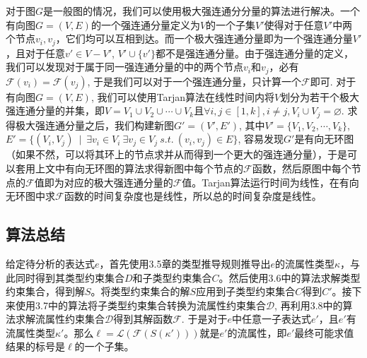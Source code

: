 \documentclass[12pt, titlepage]{article}
\let\emptyset\varnothing
\begin{document}
	对于图$G$是一般图的情况，我们可以使用极大强连通分分量的算法进行解决。一个有向图$G = (V, E)$的一个强连通分量定义为$V$的一个子集$V'$使得对于任意$V'$中两个节点$v_i, v_j$，它们均可以互相到达。而一个极大强连通分量即为一个强连通分量$V'$，且对于任意$v'\in V - V'$, $V'\cup\{v'\}$都不是强连通分量。由于强连通分量的定义，我们可以发现对于属于同一强连通分量的中的两个节点$v_i$和$v_j$，必有$\mathcal{F}(v_i) = \mathcal{F}(v_j)$, 于是我们可以对于一个强连通分量，只计算一个$\mathcal{F}$即可. 对于有向图$G = (V, E)$, 我们可以使用Tarjan算法在线性时间内将$V$划分为若干个极大强连通分量的并集，即$V = V_1\cup V_2\cup \cdots\cup V_k$且$\forall i, j \in [1, k], i \not= j, V_i\cup V_j = \emptyset$. 求得极大强连通分量之后，我们构建新图$G' = (V', E')$, 其中$V' = \{V_1, V_2, \cdots, V_k\}$, $E' =  \{(V_i, V_j)\ \mid\ \exists v_i\in V_i\ \exists v_j\in V_j\ s.t.\ (v_i, v_j)\in E\}$, 容易发现$G'$是有向无环图（如果不然，可以将其环上的节点求并从而得到一个更大的强连通分量），于是可以套用上文中有向无环图的算法求得新图中每个节点的$\mathcal{F}$函数，然后原图中每个节点的$\mathcal{F}$值即为对应的极大强连通分量的$\mathcal{F}$值。Tarjan算法运行时间为线性，在有向无环图中求$\mathcal{F}$函数的时间复杂度也是线性，所以总的时间复杂度是线性。
	
	\subsection{算法总结}
	给定待分析的表达式$e$，首先使用3.5章的类型推导规则推导出$e$的流属性类型$\kappa$，与此同时得到其类型约束集合$D$和子类型约束集合$C$。然后使用3.6中的算法求解类型约束集合，得到解$S$。将类型约束集合的解$S$应用到子类型约束集合$C$得到$C'$。接下来使用3.7中的算法将子类型约束集合转换为流属性约束集合$\mathcal{D}$, 再利用3.8中的算法求解流属性约束集合$\mathcal{D}$得到其解函数$\mathcal{F}$. 于是对于$e$中任意一子表达式$e'$，且$e'$有流属性类型$\kappa'$。那么$\ell = \mathcal{L}(\mathcal{F}(S(\kappa')))$就是$e'$的流属性，即$e'$最终可能求值结果的标号是$\ell$的一个子集。
\end{document}

